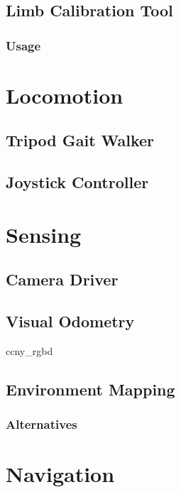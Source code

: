 \documentclass{l4proj}
\begin{document}
\subsection{Limb Calibration Tool}
\subsubsection{Usage}


\section{Locomotion}

\subsection{Tripod Gait Walker}
\subsection{Joystick Controller}

\section{Sensing}

\subsection{Camera Driver}
\subsection{Visual Odometry}
ccny\_rgbd \cite{ccny_rgbd}

\subsection{Environment Mapping}
\subsubsection{Alternatives}

\section{Navigation}
\end{document}
